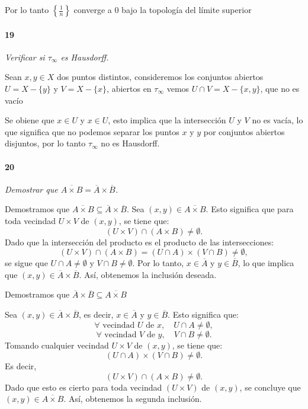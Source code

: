 \documentclass[12pt]{article}
\begin{document}
Por lo tanto \(\left\{\frac{1}{n}\right\}\) converge a 0 bajo la topolog\'ia del l\'imite superior

\paragraph{19}
\textit{Verificar si \(\tau_{\infty}\) es Hausdorff.}

Sean \(x, y \in X\) dos puntos distintos, consideremos los conjuntos abiertos \(U = X - \{y\}\) y \(V = X - \{x\}\), abiertos en \(\tau_{\infty}\)
vemos \(U \cap V = X - \{x, y\}\), que no es vac\'io

Se obiene que \(x \in U\) y \(x \in U\), esto implica que la intersecci\'on \(U\) y \(V\) no es vacía, lo que significa que no podemos separar los puntos
\(x\) y \(y\) por conjuntos abiertos disjuntos, por lo tanto \(\tau_{\infty}\) no es Hausdorff.

\paragraph{20}
\textit{Demostrar que \(\overline{A \times B} = \overline{A} \times \overline{B}\).}

Demostramos que $\overline{A \times B} \subseteq \overline{A} \times \overline{B}$. Sea $(x, y) \in \overline{A \times B}$. Esto significa que para toda vecindad $U \times V$ de $(x, y)$, se tiene que:
\[
(U \times V) \cap (A \times B) \neq \emptyset.
\]
Dado que la intersección del producto es el producto de las intersecciones:
\[
(U \times V) \cap (A \times B) = (U \cap A) \times (V \cap B) \neq \emptyset,
\]
se sigue que $U \cap A \neq \emptyset$ y $V \cap B \neq \emptyset$.
Por lo tanto, $x \in \overline{A}$ y $y \in \overline{B}$, lo que implica que $(x, y) \in \overline{A} \times \overline{B}$. Así, obtenemos la inclusión deseada.

Demostramos que $\overline{A} \times \overline{B} \subseteq \overline{A \times B}$

Sea $(x, y) \in \overline{A} \times \overline{B}$, es decir, $x \in \overline{A}$ y $y \in \overline{B}$. Esto significa que:
\[
\forall \text{ vecindad } U \text{ de } x, \quad U \cap A \neq \emptyset,
\]
\[
\forall \text{ vecindad } V \text{ de } y, \quad V \cap B \neq \emptyset.
\]
Tomando cualquier vecindad $U \times V$ de $(x, y)$, se tiene que:
\[
(U \cap A) \times (V \cap B) \neq \emptyset.
\]
Es decir,
\[
(U \times V) \cap (A \times B) \neq \emptyset.
\]
Dado que esto es cierto para toda vecindad $(U \times V)$ de $(x, y)$, se concluye que $(x, y) \in \overline{A \times B}$. Así, obtenemos la segunda inclusión.
\end{document}
